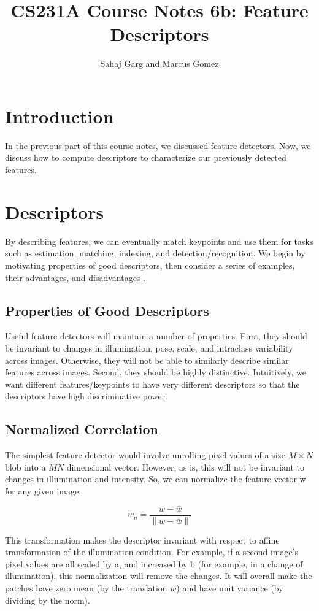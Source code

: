 \documentclass[a4paper, 12pt]{article}
\title{CS231A Course Notes 6b: Feature Descriptors}
\author{Sahaj Garg and Marcus Gomez}
\date{}
\newcommand{\norm}[1]{\left\lVert#1\right\rVert}
\numberwithin{equation}{section}
\begin{document}
\maketitle

\section{Introduction}
In the previous part of this course notes, we discussed feature detectors. Now, we discuss how to compute descriptors to characterize our previously detected features. 

\section{Descriptors}
By describing features, we can eventually match keypoints and use them for tasks such as estimation, matching, indexing, and detection/recognition. We begin by motivating properties of good descriptors, then consider a series of examples, their advantages, and disadvantages . 

\subsection{Properties of Good Descriptors}
Useful feature detectors will maintain a number of properties. First, they should be invariant to changes in illumination, pose, scale, and intraclass variability across images. Otherwise, they will not be able to similarly describe similar features across images. Second, they should be highly distinctive. Intuitively, we want different features/keypoints to have very different descriptors so that the descriptors have high discriminative power.  

\subsection{Normalized Correlation}
The simplest feature detector would involve unrolling pixel values of a size $M \times N$ blob into a $MN$ dimensional vector. However, as is, this will not be invariant to changes in illumination and intensity. So, we can normalize the feature vector w for any given image:

$$ w_n = \frac{w - \bar{w}}{\norm{w - \bar{w}}}$$

This transformation makes the descriptor invariant with respect to affine transformation of the illumination condition. For example, if a second image's pixel values are all scaled by a, and increased by b (for example, in a change of illumination), this normalization will remove the changes. It will overall make the patches have zero mean (by the translation $\bar{w}$) and have unit variance (by dividing by the norm).  
\end{document}
